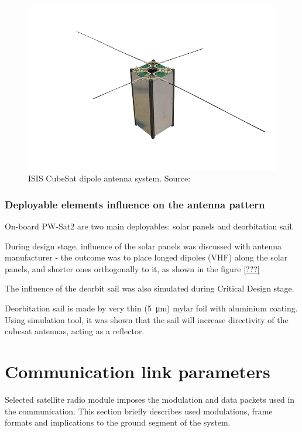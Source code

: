     \begin{figure}[H]
        \centering
        \includegraphics[width=0.8\paperwidth]{img/2/CubeSat-antenna-dipole-configuration.png}
        \caption{ISIS CubeSat dipole antenna system. Source: \cite{???}}
        \label{ISIS_antenna}
    \end{figure}


\subsection{Deployable elements influence on the antenna pattern}

On-board PW-Sat2 are two main deployables: solar panels and deorbitation sail.

During design stage, influence of the solar panels was discussed with antenna manufacturer - the outcome was to place longed dipoles (VHF) along the solar panels, and shorter ones orthogonally to it, as shown in the figure \ref{???}


The influence of the deorbit sail was also simulated during Critical Design stage.

Deorbitation sail is made by very thin (\SI{5}{\micro\meter}) mylar foil with aluminium coating. Using %
simulation tool, it was shown that the sail will increase directivity of the cubesat antennas, acting as a reflector.


\chapter{Communication link parameters}
Selected satellite radio module imposes the modulation and data packets used in the communication. This section briefly describes used modulations, frame formats and implications to the ground segment of the system.

